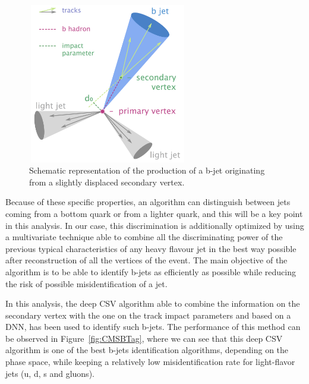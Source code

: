 \documentclass[a4paper, 10pt, openright]{report}
\begin{document}
\begin{figure}[htbp]
\begin{center}
\includegraphics[width=7cm, height=7cm]{figs/CMSBJets.png}
\caption{Schematic representation of the production of a b-jet originating from a slightly displaced secondary vertex.}
\label{fig:CMSBJets}
\end{center}
\end{figure}

Because of these specific properties, an algorithm can distinguish between jets coming from a bottom quark or from a lighter quark, and this will be a key point in this analysis. In our case, this discrimination is additionally optimized by using a multivariate technique able to combine all the discriminating power of the previous typical characteristics of any heavy flavour jet in the best way possible after reconstruction of all the vertices of the event. The main objective of the algorithm is to be able to identify b-jets as efficiently as possible while reducing the risk of possible misidentification of a jet. 

In this analysis, the deep \ac{CSV} algorithm able to combine the information on the secondary vertex with the one on the track impact parameters and based on a \ac{DNN}, has been used to identify such b-jets. The performance of this method can be observed in Figure~\ref{fig:CMSBTag}, where we can see that this deep \ac{CSV} algorithm is one of the best b-jets identification algorithms, depending on the phase space, while keeping a relatively low misidentification rate for light-flavor jets (u, d, s and gluons).
\end{document}
